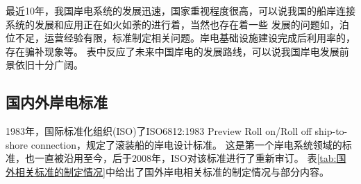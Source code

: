最近10年，我国岸电系统的发展迅速，国家重视程度很高，可以说我国的船岸连接系统的发展和应用正在如火如荼的进行着，当然也存在着一些
发展的问题如，泊位不足，运营经验有限，标准制定相关问题。岸电基础设施建设完成后利用率的，存在骗补现象等。
表中反应了未来中国岸电的发展路线，可以说我国岸电发展前景依旧十分广阔。

\begin{table}[htbp]
	\centering
	\caption{岸电发展路线图和时间表\cite{SP19}}
	\label{tab:addlabel}%
  \end{table}%
  
  

\subsection{国内外岸电标准}

1983年，国际标准化组织(ISO)了ISO6812:1983 Preview Roll on/Roll off ship-to-shore connection，规定了滚装船的岸电设计标准。
这是第一个岸电系统领域的标准，也一直被沿用至今，后于2008年，ISO对该标准进行了重新审订\cite{SP4}。
表\ref{tab:国外相关标准的制定情况}中给出了国外岸电相关标准的制定情况与部分内容。

\begin{table}[!htp]
	\centering
	\caption[国外相关标准的制定情况]{国外相关标准的制定情况}
	\label{tab:国外相关标准的制定情况}
\end{table}

